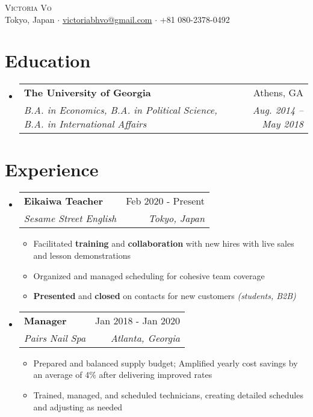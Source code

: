 \documentclass[12pt, letterpaper]{article}
\makeatletter
\newcommand{\resumeItem}[1]{
  \item\small{
    {#1 \vspace{-2pt}}
  }
}
\newcommand{\resumeSubheading}[4]{
  \vspace{-2pt}\item
    \begin{tabular*}{0.97\textwidth}[t]{l@{\extracolsep{\fill}}r}
      \textbf{#1} & #2 \\
      \textit{\small#3} & \textit{\small #4} \\
    \end{tabular*}\vspace{-7pt}
}
\newcommand{\resumeSubHeadingListStart}{\begin{itemize}[leftmargin=0.15in, label={}]}
\newcommand{\resumeSubHeadingListEnd}{\end{itemize}}
\newcommand{\resumeItemListStart}{\begin{itemize}} %
\newcommand{\resumeItemListEnd}{\end{itemize}\vspace{-16pt}}
\makeatother
\begin{document}
    

\vspace*{-12pt}
\begin{center}
	{\Huge \scshape {Victoria Vo}}\\
	\vspace{1mm}
	\faMapMarker \hspace{.5mm} Tokyo, Japan $\cdot$ 
	\faEnvelope \hspace{.5mm} \href{mailto:victoriabhvo@gmail.com}{victoriabhvo@gmail.com} $\cdot$ \faMobile \hspace{.5mm} +81 080-2378-0492
    \\
\end{center}


\section{Education}
  \resumeSubHeadingListStart
    \resumeSubheading
      {The University of Georgia}{Athens, GA}
      {B.A. in Economics, B.A. in Political Science, B.A. in International Affairs}{Aug. 2014 -- May 2018}
 \resumeSubHeadingListEnd

\section{Experience}

\resumeSubHeadingListStart
  \resumeSubheading
    {Eikaiwa Teacher}{Feb 2020 - Present}
    {Sesame Street English}{Tokyo, Japan}
    \resumeItemListStart
      \resumeItem{Facilitated \textbf{training} and \textbf{collaboration} with new hires with live sales and lesson demonstrations}
      \resumeItem{Organized and managed scheduling for cohesive team coverage}
      \resumeItem{\textbf{Presented} and \textbf{closed} on contacts for new customers \textit{(students, B2B)}}
    \resumeItemListEnd
\resumeSubHeadingListEnd


\resumeSubHeadingListStart
  \resumeSubheading
  {Manager}{Jan 2018 - Jan 2020}
  {Pairs Nail Spa}{Atlanta, Georgia}
   \resumeItemListStart
      \resumeItem{Prepared and balanced supply budget; Amplified yearly cost savings by an average of 4\% after delivering improved rates}
      \resumeItem{Trained, managed, and scheduled technicians, creating detailed schedules and adjusting as needed}
    \resumeItemListEnd
\resumeSubHeadingListEnd
\end{document}
